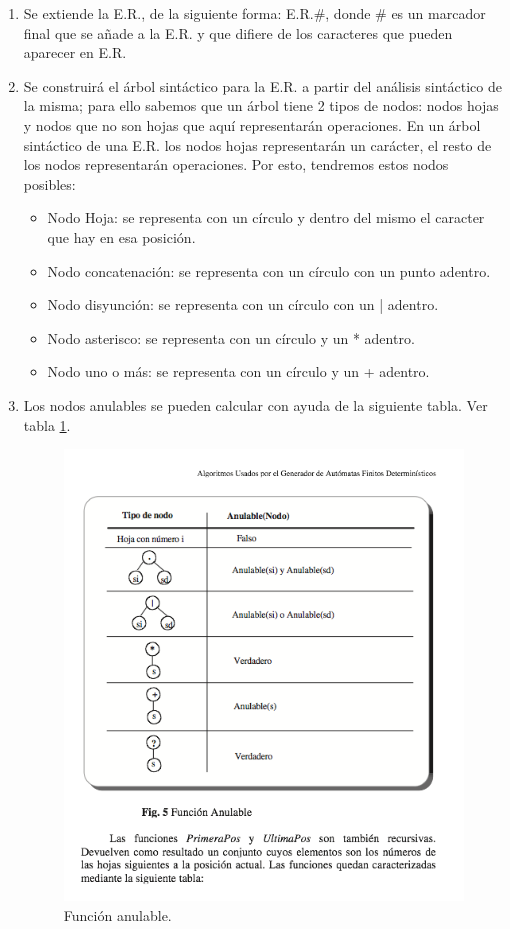 \documentclass{report}
\begin{document}
\begin{enumerate}
	\item Se extiende la E.R., de la siguiente forma: E.R.\#, donde \# es un marcador final que se añade a la E.R. y que difiere de los caracteres que pueden aparecer en E.R.
	\item Se construirá el árbol sintáctico para la E.R. a partir del análisis sintáctico de la misma; para ello sabemos que un árbol tiene 2 tipos de nodos: nodos hojas y nodos que no son hojas que aquí representarán operaciones. En un árbol sintáctico de una E.R. los nodos hojas representarán un carácter, el resto de los nodos representarán operaciones. Por esto, tendremos estos nodos posibles:
	\begin{itemize}
		\item Nodo Hoja: se representa con un círculo y dentro del mismo el caracter que hay en esa posición.
		\item Nodo concatenación: se representa con un círculo con un punto adentro.
		\item Nodo disyunción: se representa con un círculo con un | adentro.
		\item Nodo asterisco: se representa con un círculo y un * adentro.
		\item Nodo uno o más: se representa con un círculo y un + adentro.
	\end {itemize}
	\item Los nodos anulables se pueden calcular con ayuda de la siguiente tabla. Ver tabla \ref{fig:anulable}.

	\begin{figure}
		\centering
		\includegraphics[scale=.5]{img/tabla1.png}
		\caption{Función anulable.}
		\label{fig:anulable}
	\end{figure}


\end{enumerate}
\end{document}
